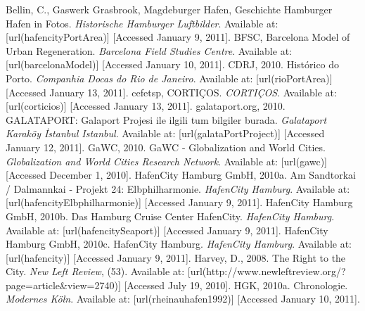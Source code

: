 \myLinks%
{%
\startREF%
Bellin, C., Gaswerk Grasbrook, Magdeburger Hafen, Geschichte Hamburger Hafen in Fotos. {\em Historische Hamburger Luftbilder}. Available at:  [url(hafencityPortArea)] [Accessed January 9, 2011]. \nl%
%
BFSC, Barcelona Model of Urban Regeneration. {\em Barcelona Field Studies Centre}. Available at:  [url(barcelonaModel)] [Accessed January 10, 2011]. \nl%
%
CDRJ, 2010. Histórico do Porto. {\em Companhia Docas do Rio de Janeiro}. Available at:  [url(rioPortArea)] [Accessed January 13, 2011]. \nl%
%
cefetsp, CORTIÇOS. {\em CORTIÇOS}. Available at:  [url(corticios)] [Accessed January 13, 2011]. \nl%
%
galataport.org, 2010. GALATAPORT: Galaport Projesi ile ilgili tum bilgiler burada. {\em Galataport Karaköy İstanbul Istanbul}. Available at:  [url(galataPortProject)] [Accessed January 12, 2011]. \nl%
%
GaWC, 2010. GaWC - Globalization and World Cities. {\em Globalization and World Cities Research Network}. Available at:  [url(gawc)] [Accessed December 1, 2010]. \nl%
%
HafenCity Hamburg GmbH, 2010a. Am Sandtorkai / Dalmannkai - Projekt 24: Elbphilharmonie. {\em HafenCity Hamburg}. Available at:  [url(hafencityElbphilharmonie)] [Accessed January 9, 2011]. \nl%
%
HafenCity Hamburg GmbH, 2010b. Das Hamburg Cruise Center HafenCity. {\em HafenCity Hamburg}. Available at:  [url(hafencitySeaport)] [Accessed January 9, 2011]. \nl%
%
HafenCity Hamburg GmbH, 2010c. HafenCity Hamburg. {\em HafenCity Hamburg}. Available at:  [url(hafencity)] [Accessed January 9, 2011]. \nl%
%
Harvey, D., 2008. The Right to the City. {\em New Left Review}, (53). Available at:  [url(http://www.newleftreview.org/?page=article&view=2740)] [Accessed July 19, 2010]. \nl%
%
HGK, 2010a. Chronologie. {\em Modernes Köln}. Available at:  [url(rheinauhafen1992)] [Accessed January 10, 2011]. \nl%
}
